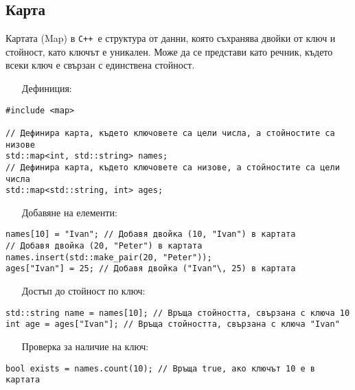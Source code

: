 \documentclass[oneside]{book}
\newcommand*{\cpp}{\texttt{C++}\ }
\begin{document}
\subsection{Карта}
Картата (Map) в \cpp е структура от данни, която съхранява двойки от ключ и стойност, като ключът е уникален. Може да се представи като речник, където всеки ключ е свързан с единствена стойност.

\begin{itemize}\item[Дефиниция:]\end{itemize}
\begin{mdframed}\begin{lstlisting}
#include <map>

// Дефинира карта, където ключовете са цели числа, а стойностите са низове
std::map<int, std::string> names;
// Дефинира карта, където ключовете са низове, а стойностите са цели числа
std::map<std::string, int> ages;
\end{lstlisting}\end{mdframed}

\begin{itemize}\item[Добавяне] на елементи:\end{itemize}
\begin{mdframed}\begin{lstlisting}
names[10] = "Ivan"; // Добавя двойка (10, "Ivan") в картата
// Добавя двойка (20, "Peter") в картата
names.insert(std::make_pair(20, "Peter"));
ages["Ivan"] = 25; // Добавя двойка ("Ivan"\, 25) в картата
\end{lstlisting}\end{mdframed}

\begin{itemize}\item[Достъп] до стойност по ключ:\end{itemize}
\begin{mdframed}\begin{lstlisting}
std::string name = names[10]; // Връща стойността, свързана с ключа 10
int age = ages["Ivan"]; // Връща стойността, свързана с ключа "Ivan"
\end{lstlisting}\end{mdframed}

\begin{itemize}\item[Проверка] за наличие на ключ:\end{itemize}
\begin{mdframed}\begin{lstlisting}
bool exists = names.count(10); // Връща true, ако ключът 10 е в картата
\end{lstlisting}\end{mdframed}
\end{document}
